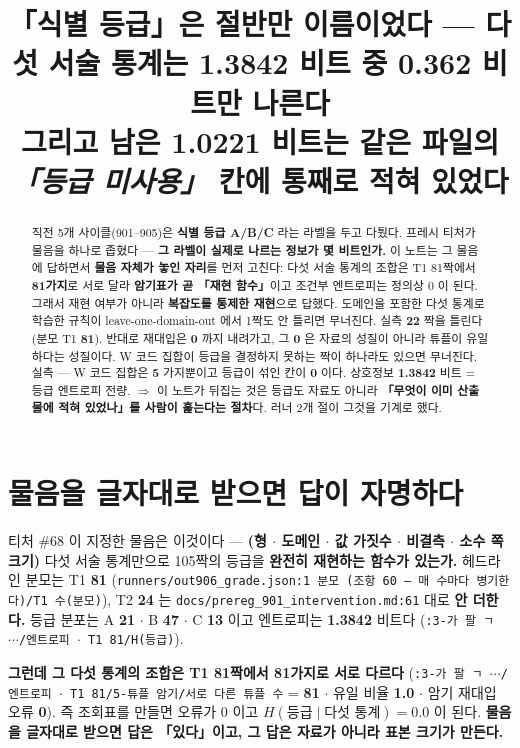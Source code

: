 \documentclass{article}
\title{「식별 등급」은 절반만 이름이었다 --- 다섯 서술 통계는 1.3842 비트 중 0.362 비트만 나른다 \\
  {\large 그리고 남은 1.0221 비트는 같은 파일의 \emph{「등급 미사용」} 칸에 통째로 적혀 있었다}}
\begin{document}
\maketitle

\begin{abstract}
직전 5개 사이클(901--905)은 \textbf{식별 등급 A/B/C} 라는 라벨을 두고 다퉜다.
프레시 티처가 물음을 하나로 좁혔다 --- \textbf{그 라벨이 실제로 나르는 정보가 몇 비트인가.}
이 노트는 그 물음에 답하면서 \textbf{물음 자체가 놓인 자리}를 먼저 고친다:
다섯 서술 통계의 조합은 T1 81짝에서 \textbf{81가지}로 서로 달라
\textbf{암기표가 곧 「재현 함수」}이고 조건부 엔트로피는 정의상 0 이 된다.
그래서 재현 여부가 아니라 \textbf{복잡도를 통제한 재현}으로 답했다.
{도메인을 포함한 다섯 통계로 학습한 규칙이 leave-one-domain-out 에서 1짝도 안 틀리면 무너진다.
실측 \textbf{22} 짝을 틀린다(분모 T1 \textbf{81}). 반대로 재대입은 \textbf{0} 까지 내려가고,
그 \textbf{0} 은 자료의 성질이 아니라 튜플이 유일하다는 성질이다.}
{W 코드 집합이 등급을 결정하지 못하는 짝이 하나라도 있으면 무너진다.
실측 --- W 코드 집합은 \textbf{5} 가지뿐이고 등급이 섞인 칸이 \textbf{0} 이다.
상호정보 \textbf{1.3842} 비트 = 등급 엔트로피 전량.}
$\Rightarrow$ 이 노트가 뒤집는 것은 등급도 자료도 아니라 \textbf{「무엇이 이미 산출물에 적혀 있었나」를
사람이 훑는다는 절차}다. 러너 2개 절이 그것을 기계로 했다.
\end{abstract}

\section{물음을 글자대로 받으면 답이 자명하다}

티처 \#68 이 지정한 물음은 이것이다 ---
\textbf{(형 $\cdot$ 도메인 $\cdot$ 값 가짓수 $\cdot$ 비결측 $\cdot$ 소수 쪽 크기)}
다섯 서술 통계만으로 105짝의 등급을 \textbf{완전히 재현하는 함수가 있는가.}
헤드라인 분모는 T1 \textbf{81}
(\texttt{runners/out906\_grade.json:1 분모 (조항 60 --- 매 수마다 병기한다)/T1 수(분모)}),
T2 \textbf{24} 는 \texttt{docs/prereg\_901\_intervention.md:61} 대로 \textbf{안 더한다.}
등급 분포는 A \textbf{21} $\cdot$ B \textbf{47} $\cdot$ C \textbf{13} 이고
엔트로피는 \textbf{1.3842} 비트다
(\texttt{:3-가 팔 ㄱ $\cdots$/엔트로피 $\cdot$ T1 81/H(등급)}).

\textbf{그런데 그 다섯 통계의 조합은 T1 81짝에서 81가지로 서로 다르다}
(\texttt{:3-가 팔 ㄱ $\cdots$/엔트로피 $\cdot$ T1 81/5-튜플 암기/서로 다른 튜플 수} = \textbf{81} $\cdot$
유일 비율 \textbf{1.0} $\cdot$ 암기 재대입 오류 \textbf{0}).
즉 조회표를 만들면 오류가 0 이고 $H(\text{등급}\mid\text{다섯 통계})=\mathbf{0.0}$ 이 된다.
\textbf{물음을 글자대로 받으면 답은 「있다」이고, 그 답은 자료가 아니라 표본 크기가 만든다.}
\end{document}
